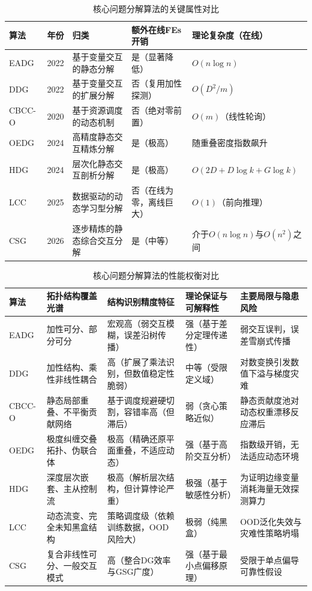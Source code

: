 \begin{table}[htbp]
\centering
\caption{核心问题分解算法的关键属性对比}
\label{tab:attributes}
\begin{tabular}{lp{1.5cm}p{3.5cm}p{3.5cm}p{3.5cm}}
\toprule
\textbf{算法} & \textbf{年份} & \textbf{归类} & \textbf{额外在线FEs开销} & \textbf{理论复杂度（在线）} \\
\midrule
EADG & 2022 & 基于变量交互的静态分解 & 是（显著降低） & $O(n \log n)$ \\
DDG & 2022 & 基于变量交互的扩展分解 & 否（复用加性探测） & $O(D^2/m)$ \\
CBCC-O & 2020 & 基于资源调度的动态机制 & 否（绝对零前置） & $O(m)$（线性轮询） \\
OEDG & 2024 & 高精度静态交互精炼分解 & 是（极高） & 随重叠密度指数飙升 \\
HDG & 2024 & 层次化静态交互剖析分解 & 是（极高） & $O(2D + D \log k + G \log k)$ \\
LCC & 2025 & 数据驱动的动态学习型分解 & 否（在线为零，离线巨大） & $O(1)$（前向推理） \\
CSG & 2026 & 逐步精炼的静态综合交互分解 & 是（中等） & 介于$O(n \log n)$与$O(n^2)$之间 \\
\bottomrule
\end{tabular}
\end{table}

\begin{table}[htbp]
\centering
\caption{核心问题分解算法的性能权衡对比}
\label{tab:tradeoffs}
\begin{tabular}{lp{1.5cm}p{3.5cm}p{3.5cm}p{3.5cm}}
\toprule
\textbf{算法} & \textbf{拓扑结构覆盖光谱} & \textbf{结构识别精度特征} & \textbf{理论保证与可解释性} & \textbf{主要局限与隐患风险} \\
\midrule
EADG & 加性可分、部分可分 & 宏观高（弱交互模糊，误差沿树传播） & 强（基于差分定理传递性） & 弱交互误判，误差雪崩式传播 \\
DDG & 加性结构、乘性非线性耦合 & 高（扩展了乘法识别，但数值稳定性脆弱） & 中等（受限定义域） & 对数变换引发数值下溢与梯度灾难 \\
CBCC-O & 静态局部重叠、不平衡贡献网络 & 基于调度规避硬切割，容错率高（但滞后） & 弱（贪心策略近似） & 静态贡献度池对动态权重漂移反应滞后 \\
OEDG & 极度纠缠交叠拓扑、伪联合体 & 极高（精确还原平面重叠，不适应动态） & 强（基于高阶交互分析） & 指数级开销，无法适应动态环境 \\
HDG & 深度层次嵌套、主从控制流 & 极高（解析层次结构，但计算悖论严重） & 极强（基于敏感性分析） & 为证明边缘变量消耗海量无效探测算力 \\
LCC & 动态流变、完全未知黑盒结构 & 策略调度级（依赖训练数据，OOD风险大） & 极弱（纯黑盒） & OOD泛化失效与灾难性策略坍塌 \\
CSG & 复合非线性可分、一般交互模式 & 高（整合DG效率与GSG广度） & 强（基于最小点偏移原理） & 受限于单点偏导可靠性假设 \\
\bottomrule
\end{tabular}
\end{table}

